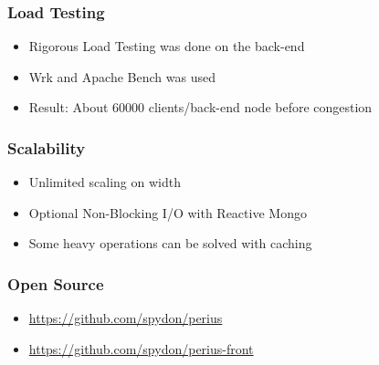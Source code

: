 \documentclass{beamer}
\begin{document}
\begin{frame}
  \frametitle{Load Testing}
  \begin{itemize}
    \item{Rigorous Load Testing was done on the back-end}
    \pause
    \item{Wrk and Apache Bench was used}
    \pause
    \item{Result: About 60000 clients/back-end node before congestion}
  \end{itemize}
\end{frame}

\begin{frame}
  \frametitle{Scalability}
  \begin{itemize}
    \item{Unlimited scaling on width}
    \pause
    \item{Optional Non-Blocking I/O with Reactive Mongo}
    \pause
    \item{Some heavy operations can be solved with caching} %
  \end{itemize}
\end{frame}

\begin{frame}
  \frametitle{Open Source}
  \begin{itemize}
    \item{\url{https://github.com/spydon/perius}}
    \item{\url{https://github.com/spydon/perius-front}}
  \end{itemize}
\end{frame}

\begin{frame}
\end{frame}

\begin{frame}
\end{frame}
\end{document}

